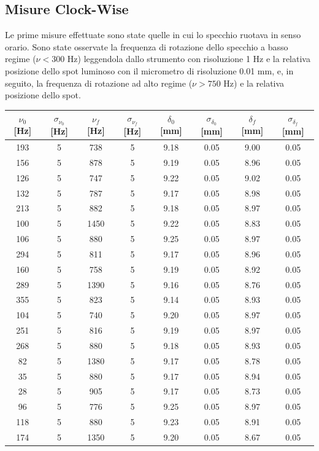 \documentclass[openright]{article}
\begin{document}
    \subsection{Misure Clock-Wise}
    Le prime misure effettuate sono state quelle in cui lo specchio ruotava in senso orario. Sono state osservate la frequenza di rotazione dello specchio a basso regime ($\nu < 300 $ Hz) leggendola dallo strumento con risoluzione 1 Hz e la relativa posizione dello spot luminoso con il micrometro di risoluzione 0.01 mm, e, in seguito, la frequenza di rotazione ad alto regime ($\nu > 750 $ Hz) e la relativa posizione dello spot. 

    \begin{table}
        \centering
        \begin{tabular}{ cccccccc } 
            \toprule
            $\nu_0$ [Hz] & $\sigma_{\nu_0}$ [Hz] & $\nu_f$ [Hz] &  $\sigma_{\nu_f}$ [Hz] & $\delta_0$ [mm] & $\sigma_{\delta_0}$ [mm] & $\delta_f$ [mm] & $\sigma_{\delta_f}$ [mm] \\ 
                \midrule
                193 & 5 & 738 & 5 & 9.18 & 0.05 & 9.00 & 0.05  \\ 
            156 & 5 & 878 & 5 & 9.19 & 0.05 & 8.96 & 0.05  \\ 
            126 & 5 & 747 & 5 & 9.22 & 0.05 & 9.02 & 0.05  \\ 
            132 & 5 & 787 & 5 & 9.17 & 0.05 & 8.98 & 0.05  \\ 
            213 & 5 & 882 & 5 & 9.18 & 0.05 & 8.97 & 0.05  \\ 
            100 & 5 & 1450 & 5 & 9.22 & 0.05 & 8.83 & 0.05  \\ 
            106 & 5 & 880 & 5 & 9.25 & 0.05 & 8.97 & 0.05  \\ 
            294 & 5 & 811 & 5 & 9.17 & 0.05 & 8.96 & 0.05  \\ 
            160 & 5 & 758 & 5 & 9.19 & 0.05 & 8.92 & 0.05  \\ 
            289 & 5 & 1390 & 5 & 9.16 & 0.05 & 8.76 & 0.05  \\ 
            355 & 5 & 823 & 5 & 9.14 & 0.05 & 8.93 & 0.05  \\ 
            104 & 5 & 740 & 5 & 9.20 & 0.05 & 8.97 & 0.05  \\ 
            251 & 5 & 816 & 5 & 9.19 & 0.05 & 8.97 & 0.05  \\ 
            268 & 5 & 880 & 5 & 9.18 & 0.05 & 8.93 & 0.05  \\ 
            82 & 5 & 1380 & 5 & 9.17 & 0.05 & 8.78 & 0.05  \\ 
            35 & 5 & 880 & 5 & 9.17 & 0.05 & 8.94 & 0.05  \\ 
            28 & 5 & 905 & 5 & 9.17 & 0.05 & 8.73 & 0.05  \\ 
            96 & 5 & 776 & 5 & 9.25 & 0.05 & 8.97 & 0.05  \\ 
            118 & 5 & 880 & 5 & 9.23 & 0.05 & 8.91 & 0.05  \\ 
            174 & 5 & 1350 & 5 & 9.20 & 0.05 & 8.67 & 0.05  \\ 
    

\end{tabular}
\end{table}
\end{document}
